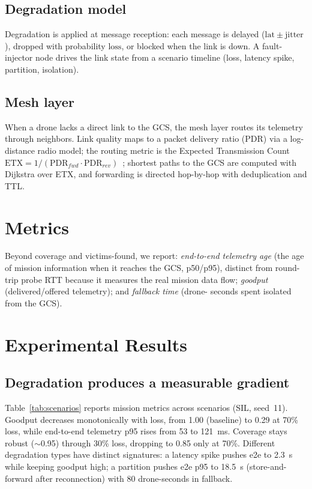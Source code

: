 \documentclass[conference]{IEEEtran}
\begin{document}
\subsection{Degradation model}
Degradation is applied at message reception: each message is delayed
($\mathrm{lat}\pm\mathrm{jitter}$), dropped with probability $\mathrm{loss}$, or
blocked when the link is down. A fault-injector node drives the link state from
a scenario timeline (loss, latency spike, partition, isolation).

\subsection{Mesh layer}
When a drone lacks a direct link to the GCS, the mesh layer routes its telemetry
through neighbors. Link quality maps to a packet delivery ratio (PDR) via a
log-distance radio model; the routing metric is the Expected Transmission Count
$\mathrm{ETX}=1/(\mathrm{PDR}_{fwd}\cdot\mathrm{PDR}_{rev})$~\cite{decouto2004};
shortest paths to the GCS are computed with Dijkstra over ETX, and forwarding is
directed hop-by-hop with deduplication and TTL.

\section{Metrics}
Beyond coverage and victims-found, we report: \emph{end-to-end telemetry age}
(the age of mission information when it reaches the GCS, p50/p95), distinct from
round-trip probe RTT because it measures the real mission data flow;
\emph{goodput} (delivered/offered telemetry); and \emph{fallback time} (drone-
seconds spent isolated from the GCS).

\section{Experimental Results}

\subsection{Degradation produces a measurable gradient}
Table~\ref{tab:scenarios} reports mission metrics across scenarios (SIL,
seed~11). Goodput decreases monotonically with loss, from 1.00 (baseline) to
0.29 at 70\% loss, while end-to-end telemetry p95 rises from 53 to 121~ms.
Coverage stays robust ($\sim$0.95) through 30\% loss, dropping to 0.85 only at
70\%. Different degradation types have distinct signatures: a latency spike
pushes e2e to 2.3~s while keeping goodput high; a partition pushes e2e p95 to
18.5~s (store-and-forward after reconnection) with 80 drone-seconds in fallback.
\end{document}
